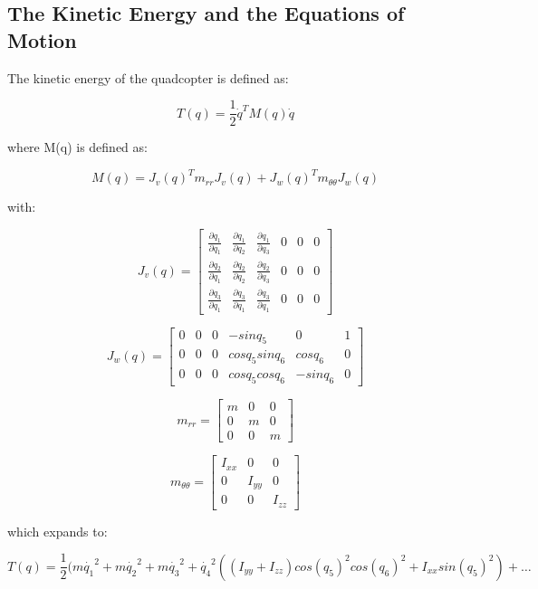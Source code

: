 \documentclass[12pt, letterpaper]{article}
\begin{document}


\subsection*{The Kinetic Energy and the Equations of Motion}

The kinetic energy of the quadcopter is defined as:

\[
T(q)=\frac{1}{2}\dot{q}^{T}M(q)\dot{q}
\]

where M(q) is defined as:

\[
M(q)=J_{v}(q)^{T}m_{rr}J_{v}(q)+J_{w}(q)^{T}m_{\theta\theta}J_{w}(q)
\]

with:

\[
J_{v}(q)=\left[\begin{array}{cccccc}
\frac{\partial q_{1}}{\partial q_{1}} & \frac{\partial q_{1}}{\partial q_{2}} & \frac{\partial q_{1}}{\partial q_{3}} & 0 & 0 & 0\\
\frac{\partial q_{2}}{\partial q_{1}} & \frac{\partial q_{2}}{\partial q_{2}} & \frac{\partial q_{2}}{\partial q_{3}} & 0 & 0 & 0\\
\frac{\partial q_{3}}{\partial q_{1}} & \frac{\partial q_{3}}{\partial q_{1}} & \frac{\partial q_{3}}{\partial q_{1}} & 0 & 0 & 0
\end{array}\right]
\]

\[
J_{w}(q)=\left[\begin{array}{cccccc}
0 & 0 & 0 & -sinq_{5} & 0 & 1\\
0 & 0 & 0 & cosq_{5}sinq_{6} & cosq_{6} & 0\\
0 & 0 & 0 & cosq_{5}cosq_{6} & -sinq_{6} & 0
\end{array}\right]
\]

\[
m_{rr}=\left[\begin{array}{ccc}
m & 0 & 0\\
0 & m & 0\\
0 & 0 & m
\end{array}\right]
\]

\[
m_{\theta\theta}=\left[\begin{array}{ccc}
I_{xx} & 0 & 0\\
0 & I_{yy} & 0\\
0 & 0 & I_{zz}
\end{array}\right]
\]

which expands to:

\[
T(q)=\frac{1}{2}(m\dot{q_{1}}^{2}+m\dot{q_{2}}^{2}+m\dot{q_{3}}^{2}+\dot{q_{4}}^{2}((I_{yy}+I_{zz})cos(q_{5})^{2}cos(q_{6})^{2}+I_{xx}sin(q_{5})^{2})+\ldots
\]
\end{document}
